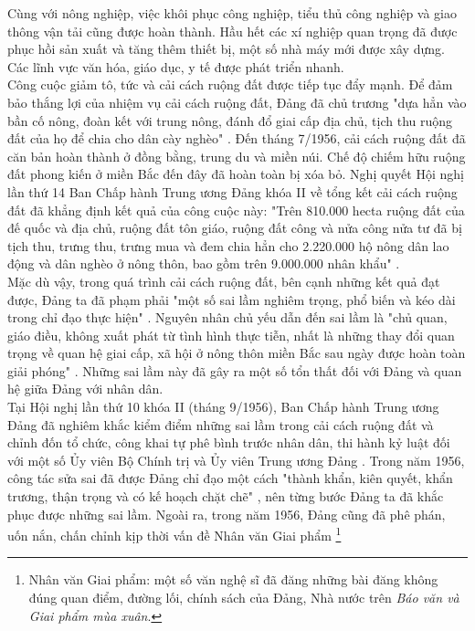 Cùng với nông nghiệp, việc khôi phục công nghiệp, tiểu thủ công nghiệp và giao thông vận tải cũng được hoàn thành. Hầu hết các xí nghiệp quan trọng đã được phục hồi sản xuất và tăng thêm thiết bị, một số nhà máy mới được xây dựng. Các lĩnh vực văn hóa, giáo dục, y tế được phát triển nhanh.\\
Công cuộc giảm tô, tức và cải cách ruộng đất được tiếp tục đẩy mạnh. Để đảm bảo thắng lợi của nhiệm vụ cải cách ruộng đất, Đảng đã chủ trương "dựa hẳn vào bần cố nông, đoàn kết với trung nông, đánh đổ giai cấp địa chủ, tịch thu ruộng đất của họ để chia cho dân cày nghèo" \supercite{giaotrinh}. Đến tháng 7/1956, cải cách ruộng đất đã căn bản hoàn thành ở đồng bằng, trung du và miền núi. Chế độ chiếm hữu ruộng đất phong kiến ở miền Bắc đến đây đã hoàn toàn bị xóa bỏ. Nghị quyết Hội nghị lần thứ 14 Ban Chấp hành Trung ương Đảng khóa II về tổng kết cải cách ruộng đất đã khẳng định kết quả của công cuộc này: "Trên 810.000 hecta ruộng đất của đế quốc và địa chủ, ruộng đất tôn giáo, ruộng đất công và nửa công nửa tư đã bị tịch thu, trưng thu, trưng mua và đem chia hẳn cho 2.220.000 hộ nông dân lao động và dân nghèo ở nông thôn, bao gồm trên 9.000.000 nhân khẩu" \supercite{hn14k2}.\\
Mặc dù vậy, trong quá trình cải cách ruộng đất, bên cạnh những kết quả đạt được, Đảng ta đã phạm phải "một số sai lầm nghiêm trọng, phổ biến và kéo dài trong chỉ đạo thực hiện" \supercite{giaotrinh}. Nguyên nhân chủ yếu dẫn đến sai lầm là "chủ quan, giáo điều, không xuất phát từ tình hình thực tiễn, nhất là những thay đổi quan trọng về quan hệ giai cấp, xã hội ở nông thôn miền Bắc sau ngày được hoàn toàn giải phóng" \supercite{giaotrinh}. Những sai lầm này đã gây ra một số tổn thất đối với Đảng và quan hệ giữa Đảng với nhân dân.\\
Tại Hội nghị lần thứ 10 khóa II (tháng 9/1956), Ban Chấp hành Trung ương Đảng đã nghiêm khắc kiểm điểm những sai lầm trong cải cách ruộng đất và chỉnh đốn tổ chức, công khai tự phê bình trước nhân dân, thi hành kỷ luật đối với một số Ủy viên Bộ Chính trị và Ủy viên Trung ương Đảng \supercite{hn10k2p1}. Trong năm 1956, công tác sửa sai đã được Đảng chỉ đạo một cách "thành khẩn, kiên quyết, khẩn trương, thận trọng và có kế hoạch chặt chẽ" \supercite{giaotrinh}, nên từng bước Đảng ta đã khắc phục được những sai lầm. Ngoài ra, trong năm 1956, Đảng cũng đã phê phán, uốn nắn, chấn chỉnh kịp thời vấn đề Nhân văn Giai phẩm \footnote{Nhân văn Giai phẩm: một số văn nghệ sĩ đã đăng những bài đăng không đúng quan điểm, đường lối, chính sách của Đảng, Nhà nước trên \textit{Báo văn và Giai phẩm mùa xuân}.}\\
